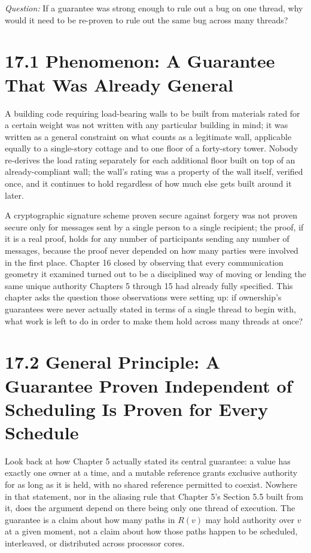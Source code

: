 \documentclass[11pt]{book}
\begin{document}
\begin{firstprinciples}
\textit{Question:} If a guarantee was strong enough to rule out a bug on one thread, why would it need to be re-proven to rule out the same bug across many threads?
\end{firstprinciples}

\section*{17.1 Phenomenon: A Guarantee That Was Already General}

A building code requiring load-bearing walls to be built from materials rated for a certain weight was not written with any particular building in mind; it was written as a general constraint on what counts as a legitimate wall, applicable equally to a single-story cottage and to one floor of a forty-story tower. Nobody re-derives the load rating separately for each additional floor built on top of an already-compliant wall; the wall's rating was a property of the wall itself, verified once, and it continues to hold regardless of how much else gets built around it later.

A cryptographic signature scheme proven secure against forgery was not proven secure only for messages sent by a single person to a single recipient; the proof, if it is a real proof, holds for any number of participants sending any number of messages, because the proof never depended on how many parties were involved in the first place. Chapter 16 closed by observing that every communication geometry it examined turned out to be a disciplined way of moving or lending the same unique authority Chapters 5 through 15 had already fully specified. This chapter asks the question those observations were setting up: if ownership's guarantees were never actually stated in terms of a single thread to begin with, what work is left to do in order to make them hold across many threads at once?

\section*{17.2 General Principle: A Guarantee Proven Independent of Scheduling Is Proven for Every Schedule}

Look back at how Chapter 5 actually stated its central guarantee: a value has exactly one owner at a time, and a mutable reference grants exclusive authority for as long as it is held, with no shared reference permitted to coexist. Nowhere in that statement, nor in the aliasing rule that Chapter 5's Section 5.5 built from it, does the argument depend on there being only one thread of execution. The guarantee is a claim about how many paths in $R(v)$ may hold authority over $v$ at a given moment, not a claim about how those paths happen to be scheduled, interleaved, or distributed across processor cores.
\end{document}
